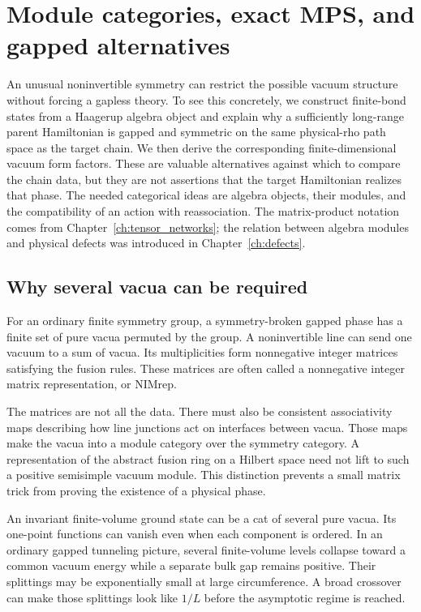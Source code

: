 \chapter{Module categories, exact MPS, and gapped alternatives}
\label{ch:gapped}

An unusual noninvertible symmetry can restrict the possible vacuum
structure without forcing a gapless theory. To see this concretely, we
construct finite-bond states from a Haagerup algebra object and explain
why a sufficiently long-range parent Hamiltonian is gapped and symmetric
on the same physical-rho path space as the target chain. We then derive
the corresponding finite-dimensional vacuum form factors. These are
valuable alternatives against which to compare the chain data, but they
are not assertions that the target Hamiltonian realizes that phase.
The needed categorical ideas are algebra objects, their modules, and
the compatibility of an action with reassociation.
The matrix-product notation comes from Chapter~\ref{ch:tensor_networks};
the relation between algebra modules and physical defects was introduced
in Chapter~\ref{ch:defects}.

\section{Why several vacua can be required}

For an ordinary finite symmetry group, a symmetry-broken gapped phase
has a finite set of pure vacua permuted by the group. A noninvertible
line can send one vacuum to a sum of vacua. Its multiplicities form
nonnegative integer matrices satisfying the fusion rules. These matrices
are often called a nonnegative integer matrix representation, or NIMrep.

The matrices are not all the data. There must also be consistent
associativity maps describing how line junctions act on interfaces
between vacua. Those maps make the vacua into a module category over
the symmetry category. A representation of the abstract fusion ring on
a Hilbert space need not lift to such a positive semisimple vacuum
module. This distinction prevents a small matrix trick from proving the
existence of a physical phase.

An invariant finite-volume ground state can be a cat of several pure
vacua. Its one-point functions can vanish even when each component is
ordered. In an ordinary gapped tunneling picture, several finite-volume
levels collapse toward a common vacuum energy while a separate bulk gap
remains positive. Their splittings may be exponentially small at large
circumference. A broad crossover can make those splittings look like
$1/L$ before the asymptotic regime is reached.

